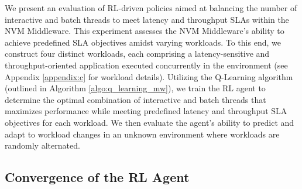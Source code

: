 

We present an evaluation of RL-driven policies aimed at balancing the number of interactive and batch threads to meet latency and throughput SLAs within the NVM Middleware. This experiment assesses the NVM Middleware's ability to achieve predefined SLA objectives amidst varying workloads. To this end, we construct four distinct workloads, each comprising a latency-sensitive and throughput-oriented application executed concurrently in the environment (see Appendix \ref{appendix:c} for workload details). Utilizing the Q-Learning algorithm (outlined in Algorithm \ref{algo:q_learning_mw}), we train the RL agent to determine the optimal combination of interactive and batch threads that maximizes performance while meeting predefined latency and throughput SLA objectives for each workload. We then evaluate the agent's ability to predict and adapt to workload changes in an unknown environment where workloads are randomly alternated.

\subsection*{Convergence of the RL Agent}

